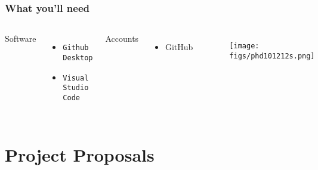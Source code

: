\documentclass{beamer}
\begin{document}
\begin{frame}
    \frametitle{What you'll need}

\begin{columns}


Software
    \begin{itemize}
        \item \texttt{Github Desktop}
        \item \texttt{Visual Studio Code}
    \end{itemize}
Accounts
    \begin{itemize}
        \item GitHub
    \end{itemize}


   \begin{figure}
    \centering
    \texttt{[image: figs/phd101212s.png]}
  \end{figure}
\end{columns}
\end{frame}


\section{Project Proposals}

\end{document}
